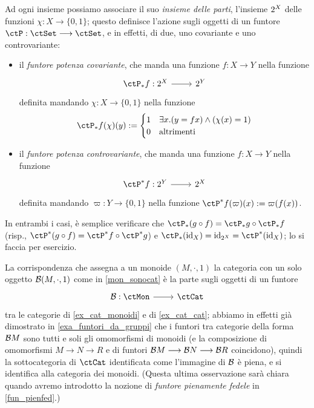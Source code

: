\begin{example}\label{ex_fun_parti}
	Ad ogni insieme possiamo associare il suo \emph{insieme delle parti}, l'insieme \(2^{X}\) delle funzioni \(\chi : X \to \{0,1\}\); questo definisce l'azione sugli oggetti di un funtore \(\ctP : \ctSet\fun\ctSet\),	e in effetti, di due, uno covariante e uno controvariante:
	\begin{itemize}
		\item il \emph{funtore potenza covariante}, che manda una funzione \(f : X\to Y\) nella funzione
		      \[\dmFun{\ctP_* f}{\pow X}{\pow Y}\]
		      definita mandando \(\chi : X\to \{0,1\}\) nella funzione \[\ctP_* f(\chi)(y) := \begin{cases}
				      1 & \exists x . (y = fx) \land (\chi(x) = 1) \\
				      0 & \text{altrimenti}                        \\
			      \end{cases}\]
		\item il \emph{funtore potenza controvariante}, che manda una funzione \(f : X\to Y\) nella funzione
		      \[\dmFun{\ctP^* f}{\pow Y}{\pow X}\]
		      definita mandando \(\varpi : Y \to \{0,1\}\) nella funzione \(\ctP^* f(\varpi)(x) := \varpi(f(x))\).
	\end{itemize}
	In entrambi i casi, è semplice verificare che \(\ctP_* (g\cmp f) = \ctP_* g\cmp \ctP_* f\) (risp., \(\ctP^* (g\cmp f) = \ctP^* f\cmp \ctP^* g\)) e \(\ctP_*(\Id[X]) = \Id[\pow X] = \ctP^*(\Id[X])\); lo si faccia per esercizio.
\end{example}
\begin{example}\label{funtore_mon_to_cat}
	La corrispondenza che assegna a un monoide \((M,\cdot,1)\) la categoria con un solo oggetto \(\mathcal{B}(M,\cdot,1)\) come in \ref{mon_sonocat} è la parte sugli oggetti di un funtore
	\[\dmFun{\susp}{\ctMon}{\ctCat}\]
	tra le categorie di \ref{ex_cat_monoidi} e di \ref{ex_cat_cat}; abbiamo in effetti già dimostrato in \ref{exa_funtori_da_gruppi} che i funtori tra categorie della forma \(\mathcal{B} M\) sono tutti e soli gli omomorfismi di monoidi (e la composizione di omomorfismi \(M\to N\to R\) e di funtori \(\mathcal{B} M \longrightarrow\mathcal{B} N \longrightarrow\mathcal{B} R\) coincidono), quindi la sottocategoria di \(\ctCat\) identificata come l'immagine di \(\mathcal{B}\) è piena, e si identifica alla categoria dei monoidi. (Questa ultima osservazione sarà chiara quando avremo introdotto la nozione di \emph{funtore pienamente fedele} in \ref{fun_pienfed}.)
\end{example}
